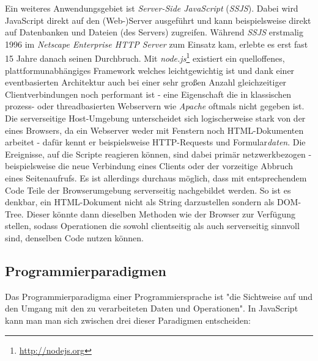 Ein weiteres Anwendungsgebiet ist \emph{Server-Side JavaScript} (\emph{SSJS}). Dabei wird JavaScript
direkt auf den (Web-)Server ausgeführt und kann beispielsweise direkt auf Datenbanken und Dateien
(des Servers) zugreifen. Während \emph{SSJS} erstmalig 1996 im \emph{Netscape Enterprise HTTP Server}
zum Einsatz kam, erlebte es erst fast 15 Jahre danach seinen Durchbruch. Mit
\emph{node.js}\footnote{\href{http://nodejs.org}{http://nodejs.org}} existiert ein quelloffenes,
plattformunabhängiges Framework welches leichtgewichtig ist und dank einer eventbasierten Architektur
auch bei einer sehr großen Anzahl gleichzeitiger Clientverbindungen noch performant ist - eine
Eigenschaft die in klassischen prozess- oder threadbasierten Webservern wie \emph{Apache} oftmals
nicht gegeben ist. Die serverseitige Host-Umgebung unterscheidet sich logischerweise stark von der
eines Browsers, da ein Webserver weder mit Fenstern noch HTML-Dokumenten arbeitet - dafür kennt er
beispielsweise HTTP-Requests und Formular\emph{daten}. Die Ereignisse, auf die Scripte reagieren
können, sind dabei primär netzwerkbezogen - beispielsweise die neue Verbindung eines Clients oder
der vorzeitige Abbruch eines Seitenaufrufs. Es ist allerdings durchaus möglich, dass mit
entsprechendem Code Teile der Browserumgebung serverseitig nachgebildet werden. So ist es denkbar,
ein HTML-Dokument nicht als String darzustellen sondern als DOM-Tree. Dieser könnte dann dieselben
Methoden wie der Browser zur Verfügung stellen, sodass Operationen die sowohl clientseitig als auch
serverseitig sinnvoll sind, denselben Code nutzen können.


\subsection{Programmierparadigmen}

Das Programmierparadigma einer Programmiersprache ist "die Sichtweise auf und den Umgang mit den zu
verarbeiteten Daten und Operationen". \citep[Kap. 1.3.1]{progsprachen}
In JavaScript kann man man sich zwischen drei dieser Paradigmen entscheiden:

